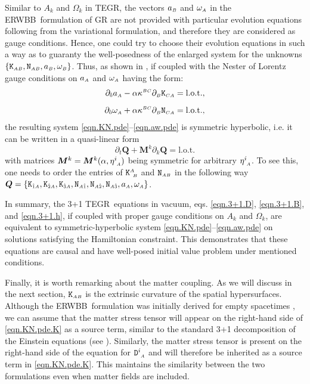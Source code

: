 \documentclass[
10pt, %
a4paper, %
oneside, %
twocolumn,
headinclude,footinclude, %
BCOR5mm, %
]{scrartcl}
\newcommand{\ERWBB}{{ERWBB}}
\newcommand{\sA}{\mathsmaller A}
\newcommand{\sB}{\mathsmaller B}
\newcommand{\sC}{\mathsmaller C}
\newcommand{\pd}[1]{\partial_{#1}}
\newcommand{\MG}[1]{\kappa^{#1}}			%
\newcommand{\itetrsymbol}{\eta}
\newcommand{\itetr}[2]{\itetrsymbol^{#1}_{\phantom{#1}#2}}
\newcommand{\Dfin}[2]{\mathtt{D}_{\phantom{#2}#1}^{#2}}	%
\newcommand{\Kbuch}[2]{\mathtt{K}_{{#1}{#2}}}	%
\newcommand{\Nbuchdown}[2]{\mathtt{N}_{#1#2}}	%
\newcommand{\Kbuchmix}[2]{\mathtt{K}^{#1}_{\ #2}}	%
\newcommand{\tegr}{TEGR}
\newcommand{\indalg}[1]{\hat{\mathsmaller{#1}}}
\begin{document}
	Similar to $ A_k $ and $ \Omega_k $ in TEGR, the vectors $ a_{\sB} $ and $
	\omega_{\sA} $ in the \ERWBB\ formulation of GR are not provided with
	particular evolution equations following from the variational formulation,
	and therefore they are considered as gauge conditions. Hence, one could try
	to choose their evolution equations in such a way as to guaranty the
	well-posedness of the enlarged system for the unknowns $
	\{\Kbuch{\sA}{\sB},\Nbuchdown{\sA}{\sB},a_\sB,\omega_\sB \}$. Thus, as shown
	in \cite{Estabrook1997,Buchman2003}, if coupled with the Nester of Lorentz
	gauge conditions on $a_\sA$ and $\omega_\sA$ having the form:
	\begin{subequations}\label{eqn.aw.pde}
		\begin{align}
			\pd{\indalg{0}} a_\sA - \alpha \MG{\sB\sC}\pd{\sB} \Kbuch{\sC}{\sA} &= \text{l.o.t.},
			\\[2mm]
			\pd{\indalg{0}} \omega_\sA + \alpha \MG{\sB\sC}\pd{\sB} \Nbuchdown{\sC}{\sA} &= \text{l.o.t.},
		\end{align}
	\end{subequations}
	the resulting system \eqref{eqn.KN.pde}--\eqref{eqn.aw.pde} is symmetric
	hyperbolic, i.e. it can be written in a quasi-linear form
	\begin{equation}\label{eqn.quasi.lin}
		\pd{t} \bm{Q} + \bm{M}^k\pd{k} \bm{Q} = \text{l.o.t.}
	\end{equation}
	with matrices $ \bm{M}^k = \bm{M}^k(\alpha,\itetr{i}{\sA})$ being symmetric for arbitrary $\itetr{i}{\sA}$.
	To see this, one needs to order the entries of
	$\Kbuchmix{\sA}{\sB}$ and $\Nbuchdown{\sA}{\sB}$ in the following way
	$\bm{Q} = \{\Kbuch{\indalg{1}}{\sA},\Kbuch{\indalg{2}}{\sA},\Kbuch{\indalg{3}}{\sA},\Nbuchdown{\sA}{\indalg{1}},\Nbuchdown{\sA}{\indalg{2}},\Nbuchdown{\sA}{\indalg{3}},a_\sA,\omega_\sA\}$.
	
	In summary, the 3+1 \tegr\ equations in vacuum, eqs. \eqref{eqn.3+1.D},
	\eqref{eqn.3+1.B}, and \eqref{eqn.3+1.h}, if coupled with proper gauge
	conditions on $A_k$ and $\Omega_k$, are equivalent to symmetric-hyperbolic
	system \eqref{eqn.KN.pde}--\eqref{eqn.aw.pde} on solutions satisfying the
	Hamiltonian constraint. This demonstrates that these equations are causal
	and have well-posed initial value problem under mentioned conditions.

	Finally, it is worth remarking about the matter coupling. As we will
	discuss in the next section, $\Kbuch{\sA}{\sB}$ is the extrinsic curvature
	of the spatial hypersurfaces. Although the \ERWBB\ formulation was initially
	derived for empty spacetimes \cite{Estabrook1997,Buchman2003}, we can assume
	that the matter stress tensor will appear on the right-hand side of
	\eqref{eqn.KN.pde.K} as a source term, similar to the standard 3+1
	decomposition of the Einstein equations (see
	\cite[eq.(5.19)]{Gourgoulhon2012a}). Similarly, the matter stress tensor is
	present on the right-hand side of the equation for $\Dfin{\sA}{i}$ and will
	therefore be inherited as a source term in \eqref{eqn.KN.pde.K}. This
	maintains the similarity between the two formulations even when matter
	fields are included.
	
\end{document}
